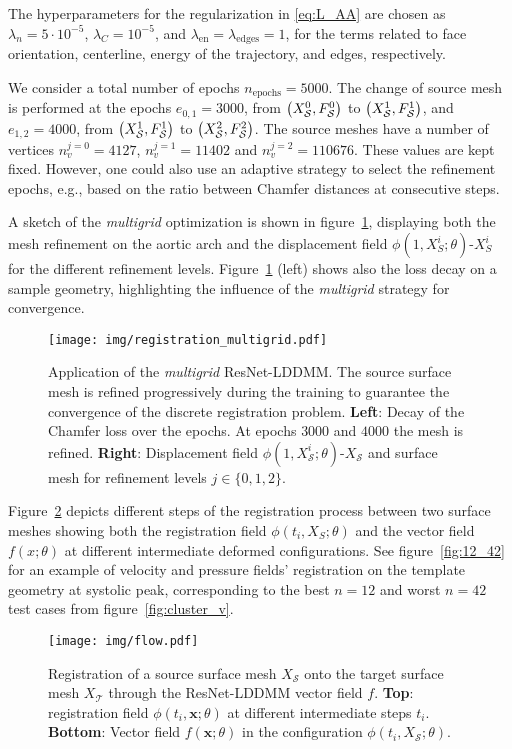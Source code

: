 The hyperparameters for the regularization in \eqref{eq:L_AA} are chosen as $\lambda_n=5\cdot 10^{-5}$, $\lambda_C = 10^{-5}$, 
and   $\lambda_{\text{en}}=\lambda_{\text{edges}}=1$, for the terms related to face orientation, centerline, energy of the trajectory, and edges, respectively.


We consider a total number of epochs $n_{\text{epochs}}=5000$. The change of source mesh is performed at the epochs $e_{0,1} = 3000$, 
from $\left(X_{\mathcal S}^{0}, F_{\mathcal S}^{0}\right)$ to $\left(X_{\mathcal S}^{1}, F_{\mathcal S}^{1}\right)$, and  $e_{1,2} = 4000$, from $\left(X_{\mathcal S}^{1}, F_{\mathcal S}^{1}\right)$ 
to $\left(X_{\mathcal S}^{2}, F_{\mathcal S}^{2}\right)$. The source meshes have a number of vertices $n^{j=0}_v=4127$, $n^{j=1}_v=11402$ and  $n^{j=2}_v=110676$.
These values are kept fixed. However, one could also use an adaptive strategy to select the refinement epochs, e.g., based on the ratio between Chamfer distances at consecutive steps.

A sketch of the \textit{multigrid} optimization is shown in figure~\ref{fig:multigrid}, displaying both the mesh refinement on the aortic arch and the 
displacement field $\phi(1, X_S^i;\theta)\text{-}X_S^i$ for the different refinement levels. Figure~\ref{fig:multigrid} (left) shows also 
the loss decay on a sample geometry, highlighting the influence of the \textit{multigrid} strategy for convergence.
\begin{figure}[!htp]
  \centering
  \texttt{[image: img/registration\_multigrid.pdf]}
  \caption{Application of the \textit{multigrid} ResNet-LDDMM. The source surface mesh is refined progressively during the training to guarantee the convergence of the discrete registration problem. 
\textbf{Left}: Decay of the Chamfer loss over the epochs. At epochs $3000$ and $4000$ the mesh is refined. 
\textbf{Right}: Displacement field $\phi(1, X_\mathcal{S}^i;\theta)\text{-}X_\mathcal{S}$ and surface mesh for refinement levels $j\in\{0, 1, 2\}$.}
  \label{fig:multigrid}
\end{figure}
Figure~\ref{fig:flow} depicts different steps of the registration process between two surface meshes showing
both the registration field $\phi(t_i, X_S;\theta)$ and the vector field $f(x;\theta)$ at different intermediate deformed configurations. See figure~\ref{fig:12_42} for an example of velocity and pressure fields' registration on the template geometry at systolic peak, corresponding to the best $n=12$ and worst $n=42$ test cases from figure~\ref{fig:cluster_v}. 
%
\begin{figure}[!htp]
  \centering
  \texttt{[image: img/flow.pdf]}
  \caption{Registration of a source surface mesh $X_\mathcal{S}$ onto the target surface mesh $X_\mathcal{T}$ through the ResNet-LDDMM vector field $f$. 
  \textbf{Top}: registration field $\phi(t_i, \mathbf x;\theta)$ at different intermediate steps $t_i$. \textbf{Bottom}: Vector field $f(\mathbf x;\theta)$ in the configuration $\phi(t_i, X_\mathcal{S};\theta)$.}
  \label{fig:flow}
\end{figure}

